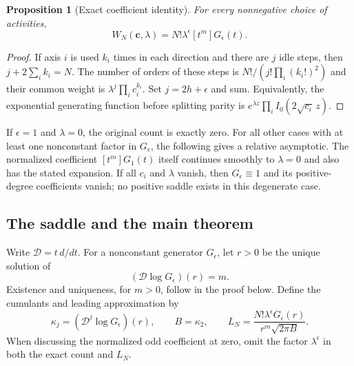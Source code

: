 \documentclass[11pt,letterpaper]{article}
\newtheorem{proposition}[theorem]{Proposition}
\theoremstyle{remark}\newtheorem{remark}[theorem]{Remark}
\newcommand{\Dop}{\mathcal D}
\newcommand{\ep}{\epsilon}
\begin{document}
\begin{proposition}[Exact coefficient identity]\label{lcw:ulb:prop:exact}
For every nonnegative choice of activities,
\begin{equation}\label{lcw:ulb:eq:exact}
 W_N(\boldsymbol c,\lambda)
 =N!\lambda^\ep[t^m]G_\ep(t).
\end{equation}
\end{proposition}
\begin{proof}
If axis $i$ is used $k_i$ times in each direction and there are $j$
idle steps, then $j+2\sum_i k_i=N$. The number of orders of these
steps is $N!/(j!\prod_i(k_i!)^2)$ and their common weight is
$\lambda^j\prod_i c_i^{k_i}$. Set $j=2h+\ep$ and sum. Equivalently,
the exponential generating function before splitting parity is
$e^{\lambda z}\prod_i I_0(2\sqrt{c_i}\,z)$.
\end{proof}

If $\ep=1$ and $\lambda=0$, the original count is exactly zero.
For all other cases with at least one nonconstant factor in $G_\ep$,
the following gives a relative asymptotic. The normalized coefficient
$[t^m]G_1(t)$ itself continues smoothly to $\lambda=0$ and also has
the stated expansion. If all $c_i$ and $\lambda$ vanish, then
$G_\ep\equiv1$ and its positive-degree coefficients vanish; no
positive saddle exists in this degenerate case.

\subsection{The saddle and the main theorem}

Write $\Dop=t\,d/dt$. For a nonconstant generator $G_\ep$, let $r>0$
be the unique solution of
\begin{equation}\label{lcw:ulb:eq:saddle}
 (\Dop\log G_\ep)(r)=m.
\end{equation}
Existence and uniqueness, for $m>0$, follow in the proof below. Define
the cumulants and leading approximation by
\begin{equation}\label{lcw:ulb:eq:cumulants}
 \kappa_j=(\Dop^j\log G_\ep)(r),\qquad B=\kappa_2,
 \qquad L_N=\frac{N!\lambda^\ep G_\ep(r)}{r^m\sqrt{2\pi B}}.
\end{equation}
When discussing the normalized odd coefficient at zero, omit the
factor $\lambda^\ep$ in both the exact count and $L_N$.
\end{document}
